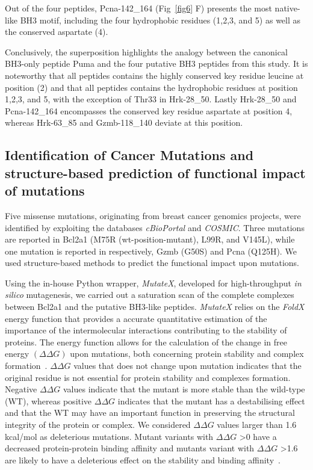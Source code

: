 \documentclass[10pt,letterpaper]{article}
\begin{document}
Out of the four peptides, Pcna-142\_164 (Fig~\ref{fig6} F) presents the most native-like BH3 motif, including the four hydrophobic residues (1,2,3, and 5) as well as the conserved aspartate (4). 

\smallskip

Conclusively, the superposition highlights the analogy between the canonical BH3-only peptide Puma and the four putative BH3 peptides from this study. It is noteworthy that all peptides contains the highly conserved key residue leucine at position (2) and that all peptides contains the hydrophobic residues at position 1,2,3, and 5, with the exception of Thr33 in Hrk-28\_50. Lastly Hrk-28\_50 and Pcna-142\_164 encompasses the conserved key residue aspartate at position 4, whereas Hrk-63\_85 and Gzmb-118\_140 deviate at this position.


\subsection*{Identification of Cancer Mutations and structure-based prediction of functional impact of mutations}

Five missense mutations, originating from breast cancer genomics projects, were identified by exploiting the databases \textit{cBioPortal} and \textit{COSMIC}. Three mutations are reported in Bcl2a1 (M75R (wt-position-mutant), L99R, and V145L), while one mutation is reported in respectively, Gzmb (G50S) and Pcna (Q125H). We used structure-based methods to predict the functional impact upon mutations.

\smallskip

Using the in-house Python wrapper, \textit{MutateX}, developed for high-throughput \textit{in silico} mutagenesis, we carried out a saturation scan of the complete complexes between Bcl2a1 and the putative BH3-like peptides.
\textit{MutateX} relies on the \textit{FoldX} energy function that provides a accurate quantitative estimation of the importance of the intermolecular interactions contributing to the stability of proteins. The energy function allows for the calculation of the change in free energy $(\Delta\Delta G)$ upon mutations, both concerning protein stability and complex formation~\cite{Nygaard2016, Guerois2002}. 
$\Delta\Delta G$ values that does not change upon mutation indicates that the original residue is not essential for protein stability and complexes formation. Negative $\Delta\Delta G$ values indicate that the mutant is more stable than the wild-type (WT), whereas positive $\Delta\Delta G$ indicates that the mutant has a destabilising effect and that the WT may have an important function in preserving the structural integrity of the protein or complex. We considered $\Delta\Delta G$ values larger than 1.6 kcal/mol as deleterious mutations. Mutant variants with $\Delta\Delta G$ \textgreater0 have a decreased protein-protein binding affinity and mutants variant with $\Delta\Delta G$ \textgreater1.6 are likely to have a deleterious effect on the stability and binding affinity~\cite{Nygaard2016}. 
\end{document}
